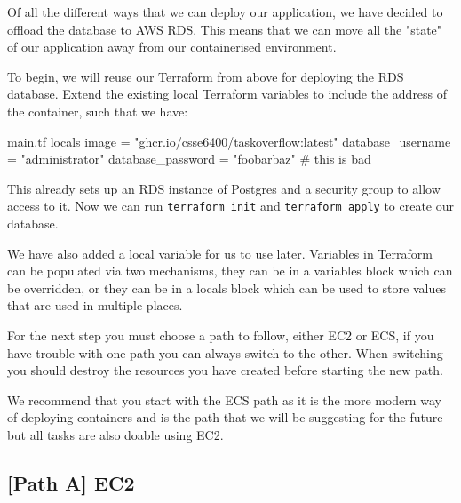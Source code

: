 \documentclass{csse4400}
\begin{document}
Of all the different ways that we can deploy our application, we have decided to offload the database to AWS RDS.
This means that we can move all the "state" of our application away from our containerised environment.

To begin, we will reuse our Terraform from above for deploying the RDS database.
Extend the existing local Terraform variables to include the address of the container, such that we have:

\begin{code}[language=terraform,numbers=none]{main.tf}
locals {
    image             = "ghcr.io/csse6400/taskoverflow:latest"
    database_username = "administrator"
    database_password = "foobarbaz" # this is bad
}
\end{code}

This already sets up an RDS instance of Postgres and a security group to allow access to it.
Now we can run \texttt{terraform init} and \texttt{terraform apply} to create our database.

We have also added a local variable for us to use later.
Variables in Terraform can be populated via two mechanisms,
they can be in a variables block which can be overridden,
or they can be in a locals block which can be used to store values that are used in multiple places.

For the next step you must choose a path to follow,
either EC2 or ECS,
if you have trouble with one path you can always switch to the other.
When switching you should destroy the resources you have created before starting the new path.

We recommend that you start with the ECS path as it is the more modern way of deploying containers and is the path that we will be suggesting for the future but all tasks are also doable using EC2.

\subsection{[Path A] EC2}

\end{document}
